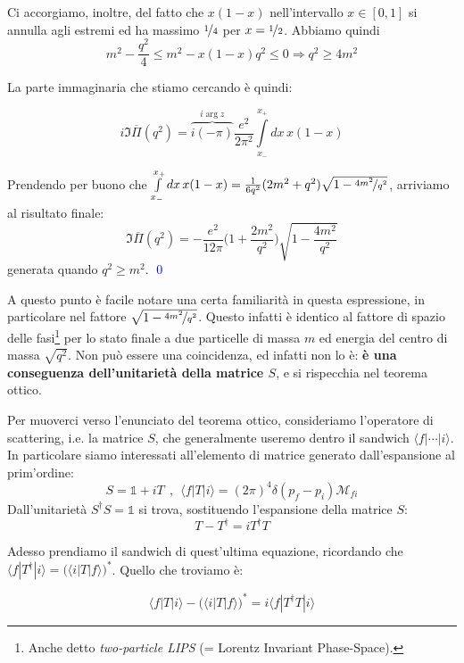\documentclass[../main.tex]{subfiles}
\begin{document}
Ci accorgiamo, inoltre, del fatto che \(x(1-x)\) nell'intervallo \(x\in[0,1]\) si annulla agli estremi ed ha massimo \(\nicefrac{1}{4}\) per \(x=\nicefrac{1}{2}\). Abbiamo quindi
\[
m^2-\frac{q^2}{4} \leq m^2 - x(1-x)q^2 \leq 0 \Rightarrow \boxed{q^2\geq 4m^2}
\]

La parte immaginaria che stiamo cercando è quindi:

\[
i\Im \overline{\Pi}(q^2) = \overbrace{i(-\pi)}^{i\arg z} \frac{e^2}{2\pi^2}\int\limits_{x_-}^{x_+} dx \,x(1-x)
\]

Prendendo per buono che \(\int\limits_{x_-}^{x_+} dx \,x(1-x) = \frac{1}{6q^2}(2m^2+q^2)\sqrt{1-\nicefrac{4m^2}{q^2}}\), arriviamo al risultato finale:
\begin{equation}
    \boxed{
    \Im \overline{\Pi}(q^2) = -\frac{e^2}{12\pi}\bigg(1 + \frac{2m^2}{q^2}\bigg)\sqrt{1-\frac{4m^2}{q^2}}
    }
    \label{eq:barPi_imaginarypart}
\end{equation}
generata quando \(q^2 \geq m^2\). \textcolor{blue}{\qed}

A questo punto è facile notare una certa familiarità in questa espressione, in particolare nel fattore \(\sqrt{1-\nicefrac{4m^2}{q^2}}\). Questo infatti è identico al fattore di spazio delle fasi\footnote{Anche detto \textit{two-particle LIPS} (= Lorentz Invariant Phase-Space).} per lo stato finale a due particelle di massa $m$ ed energia del centro di massa $\sqrt{q^2}$. Non può essere una coincidenza, ed infatti non lo è: \textbf{è una conseguenza dell'unitarietà della matrice $S$}, e si rispecchia nel teorema ottico.

Per muoverci verso l'enunciato del teorema ottico, consideriamo l'operatore di scattering, i.e. la matrice $S$, che generalmente useremo dentro il sandwich $\langle f | \cdots | i \rangle$. In particolare siamo interessati all'elemento di matrice generato dall'espansione al prim'ordine:
\[
S = \mathbb 1 + iT ~~,~~ \langle f | T | i \rangle = (2\pi)^4\delta(p_f-p_i)\mathscr M_{fi}
\]
Dall'unitarietà \(S^\dagger S = \mathbb 1\) si trova, sostituendo l'espansione della matrice $S$:
\[
T-T^\dagger = iT^\dagger T
\]

Adesso prendiamo il sandwich di quest'ultima equazione, ricordando che \(\langle f | T^\dagger | i \rangle = \big(\langle i | T | f \rangle \big)^\ast\). Quello che troviamo è:

\[
\langle f | T | i \rangle - \big(\langle i | T | f \rangle \big)^\ast = i \langle f | T^\dagger T | i \rangle 
\]
\end{document}

